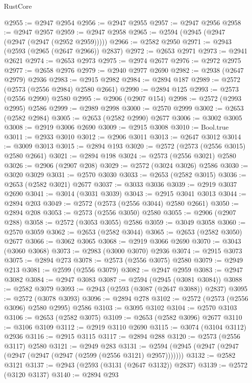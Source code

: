 \begin{lexlean}{RustCore}
\begin{coremodule}
@2955 := @2947 @2954
@2956 := @2947 @2955
@2957 := @2947 @2956
@2958 := @2947 @2957
@2959 := @2947 @2958
@2965 := @2594 (@2945 (@2947 (@2947 (@2947 (@2952 @2959)))))
@2966 := @2582 @2950
@2971 := @2943 (@2593 (@2965 (@2647 @2966)) @2837)
@2972 := @2653 @2971
@2973 := @2941 @2621
@2974 := @2653 @2973
@2975 := @2974 @2677
@2976 := @2972 @2975
@2977 := @2658 @2976
@2979 := @2940 @2977 @2690
@2982 := @2938 (@2647 @2979) @2936
@2983 := @2915 @2982
@2984 := @2894 @187
@2989 := @2572 (@2573 (@2556 @2984) @2580 @2661)
@2990 := @2894 @125
@2993 := @2573 (@2556 @2990) @2580
@2995 := @2906 (@2907 @154)
@2998 := @2572 (@2993 @2995) @2586
@2999 := @2989 @2998
@3000 := @2570 @2999
@3002 := @2653 (@2582 @2984)
@3005 := @2653 (@2582 @2990) @2677
@3006 := @3002 @3005
@3008 := @2919 @3006 @2690
@3009 := @2915 @3008
@3010 := Bool.true
@3011 := @2933 @3010
@3012 := @2906 @3011
@3013 := @2647 @3012
@3014 := @3009 @3013
@3015 := @2894 @193
@3020 := @2572 (@2573 (@2556 @3015) @2580 @2661)
@3021 := @2894 @198
@3024 := @2573 (@2556 @3021) @2580
@3026 := @2906 (@2907 @208)
@3029 := @2572 (@3024 @3026) @2586
@3030 := @3020 @3029
@3031 := @2570 @3030
@3033 := @2653 (@2582 @3015)
@3036 := @2653 (@2582 @3021) @2677
@3037 := @3033 @3036
@3039 := @2919 @3037 @2690
@3041 := @3014 (@3031 @3039)
@3043 := @2915 @3041 @3013
@3044 := @2894 @203
@3049 := @2572 (@2573 (@2556 @3044) @2580 @2661)
@3050 := @2894 @208
@3053 := @2573 (@2556 @3050) @2580
@3055 := @2906 (@2907 @288)
@3058 := @2572 (@3053 @3055) @2586
@3059 := @3049 @3058
@3060 := @2570 @3059
@3062 := @2653 (@2582 @3044)
@3065 := @2653 (@2582 @3050) @2677
@3066 := @3062 @3065
@3068 := @2919 @3066 @2690
@3070 := @3043 (@3060 @3068)
@3073 := @2983 (@3000 @3070) @2936
@3074 := @2915 @3073
@3075 := @2894 @273
@3078 := @2573 (@2556 @3075) @2580
@3079 := @2949 @213
@3081 := @2599 (@2556 @3079)
@3082 := @2947 @2959
@3083 := @2947 @3082
@3084 := @2947 @3083
@3087 := @2594 (@2945 (@3081 @3084))
@3088 := @2582 @3079
@3093 := @2943 (@2593 (@3087 (@2647 @3088)) @2837)
@3095 := @2572 (@3078 @3093)
@3096 := @2894 @278
@3102 := @2572 (@2573 (@2556 @3096) @2580 @2995) @2586
@3103 := @3095 @3102
@3104 := @2570 @3103
@3106 := @2653 (@2582 @3075)
@3109 := @2653 (@2582 @3096) @2677
@3110 := @3106 @3109
@3112 := @2919 @3110 @2690
@3115 := @3074 (@3104 @3112) @2936
@3116 := @2915 @3115
@3117 := @2894 @288
@3120 := @2573 (@2556 @3117) @2580
@3121 := @2949 @283
@3131 := @2594 (@2945 (@2947 (@2947 (@2947 (@2947 (@2947 (@2599 (@2556 @3121) @2957)))))))
@3132 := @2582 @3121
@3137 := @2943 (@2593 (@3131 (@2647 @3132)) @2837)
@3139 := @2572 (@3120 @3137)
@3140 := @2894 @293

\end{coremodule}
\end{lexlean}
